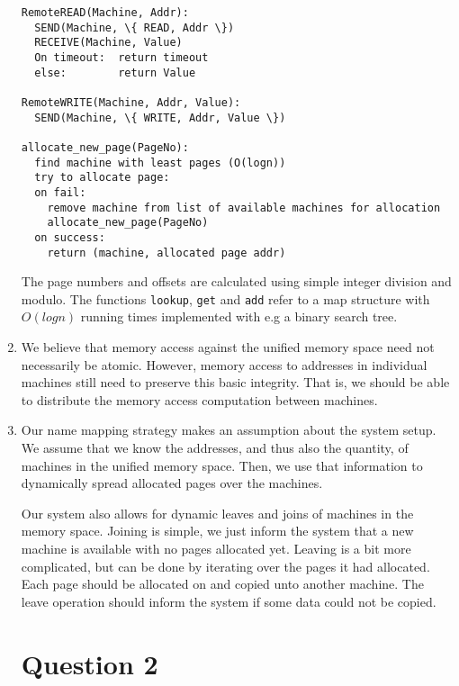 \documentclass[11pt]{article}
\begin{document}
\begin{enumerate}
\begin{Verbatim}
RemoteREAD(Machine, Addr):
  SEND(Machine, \{ READ, Addr \})
  RECEIVE(Machine, Value)
  On timeout:  return timeout
  else:        return Value

RemoteWRITE(Machine, Addr, Value):
  SEND(Machine, \{ WRITE, Addr, Value \})

allocate_new_page(PageNo):
  find machine with least pages (O(logn))
  try to allocate page:
  on fail:
    remove machine from list of available machines for allocation
    allocate_new_page(PageNo)
  on success:
    return (machine, allocated page addr)

\end{Verbatim}
    The page numbers and offsets are calculated using simple integer division and
    modulo. The functions \verb|lookup|, \verb|get| and \verb|add| refer to a map
    structure with $O(logn)$ running times implemented with e.g a binary search
    tree.

  \item
    We believe that memory access against the unified memory space need not
    necessarily be atomic. However, memory access to addresses in individual
    machines still need to preserve this basic integrity. That is, we should be able
    to distribute the memory access computation between machines.

  \item
    Our name mapping strategy makes an assumption about the system setup.
    We assume that we know the addresses, and thus also the quantity, of machines in
    the unified memory space. Then, we use that information to dynamically spread
    allocated pages over the machines.

    Our system also allows for dynamic leaves and joins of machines in the memory
    space. Joining is simple, we just inform the system that a new machine is
    available with no pages allocated yet. Leaving is a bit more complicated, but
    can be done by iterating over the pages it had allocated. Each page should be
    allocated on and copied unto another machine. The leave operation should inform
    the system if some data could not be copied.

\section{Question 2}


\end{enumerate}
\end{document}
